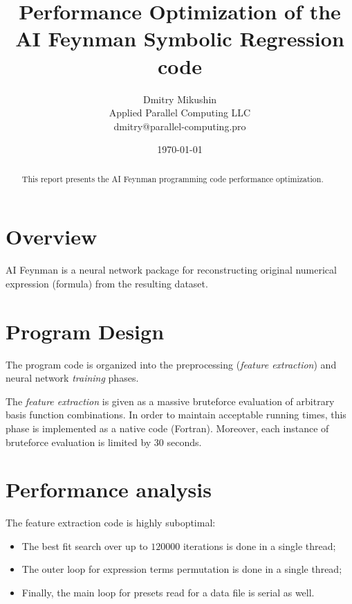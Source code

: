 \documentclass[peerreview]{IEEEtran}
\begin{document}
\setcounter{page}{1}

\title{Performance Optimization of the AI Feynman Symbolic Regression code}

\author{Dmitry Mikushin \\
Applied Parallel Computing LLC \\
dmitry@parallel-computing.pro \\
}
\date{\today}

\maketitle
\tableofcontents

\begin{abstract}
This report presents the AI Feynman programming code performance optimization.
\end{abstract}

\section{Overview}

AI Feynman \cite{aifeynman} is a neural network package for reconstructing original numerical expression (formula) from the resulting dataset.

\section{Program Design}

The program code is organized into the preprocessing (\emph{feature extraction}) and neural network \emph{training} phases.

The \emph{feature extraction} is given as a massive bruteforce evaluation of arbitrary basis function combinations. In order to maintain acceptable running times, this phase is implemented as a native code (Fortran). Moreover, each instance of bruteforce evaluation is limited by 30 seconds.

\section{Performance analysis}

The feature extraction code is highly suboptimal:

\begin{itemize}
\item The best fit search over up to $120000$ iterations is done in a single thread;
\item The outer loop for expression terms permutation is done in a single thread;
\item Finally, the main loop for presets read for a data file is serial as well.
\end{itemize}
\end{document}
